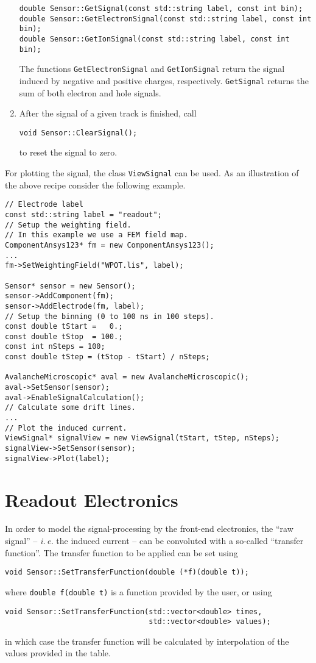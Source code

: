 \begin{enumerate}
  \begin{lstlisting}
double Sensor::GetSignal(const std::string label, const int bin);
double Sensor::GetElectronSignal(const std::string label, const int bin);
double Sensor::GetIonSignal(const std::string label, const int bin); 
  \end{lstlisting}
  The functions \texttt{GetElectronSignal} and 
  \texttt{GetIonSignal} return the signal induced by negative 
  and positive charges, respectively. \texttt{GetSignal} returns 
  the sum of both electron and hole signals.   
  \item
  After the signal of a given track is finished, call
  \begin{lstlisting}
void Sensor::ClearSignal();
  \end{lstlisting}
  to reset the signal to zero.
\end{enumerate}

For plotting the signal, the class \texttt{ViewSignal} can be used.
As an illustration of the above recipe consider the following example. 
\begin{lstlisting}
// Electrode label
const std::string label = "readout";
// Setup the weighting field.
// In this example we use a FEM field map.
ComponentAnsys123* fm = new ComponentAnsys123();
...
fm->SetWeightingField("WPOT.lis", label);

Sensor* sensor = new Sensor();
sensor->AddComponent(fm);
sensor->AddElectrode(fm, label);
// Setup the binning (0 to 100 ns in 100 steps).
const double tStart =   0.;
const double tStop  = 100.;
const int nSteps = 100;
const double tStep = (tStop - tStart) / nSteps;

AvalancheMicroscopic* aval = new AvalancheMicroscopic();
aval->SetSensor(sensor);
aval->EnableSignalCalculation();
// Calculate some drift lines.
...
// Plot the induced current.
ViewSignal* signalView = new ViewSignal(tStart, tStep, nSteps);
signalView->SetSensor(sensor);
signalView->Plot(label);
\end{lstlisting}

\section{Readout Electronics}

In order to model the signal-processing by the front-end electronics, the 
``raw signal'' -- \textit{i.\,e.} the induced current -- 
can be convoluted with a so-called ``transfer function''. 
The transfer function to be applied can be set using
\begin{lstlisting}
void Sensor::SetTransferFunction(double (*f)(double t));
\end{lstlisting}
where \texttt{double f(double t)} is a function provided by the user, 
or using
\begin{lstlisting}
void Sensor::SetTransferFunction(std::vector<double> times,
                                 std::vector<double> values);
\end{lstlisting}
in which case the transfer function will be calculated by 
interpolation of the values provided in the table.

